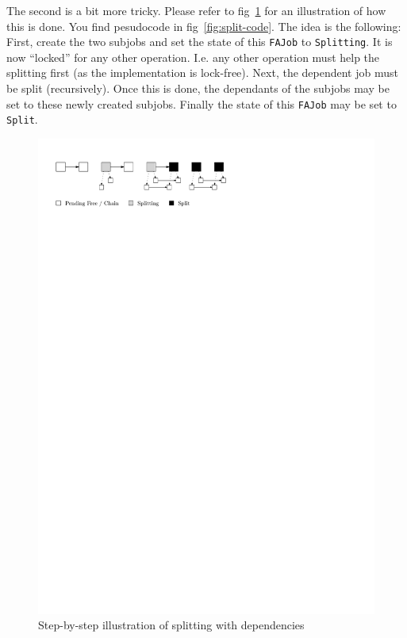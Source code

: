 \documentclass[runningheads,a4paper,fleqn]{llncs}
\begin{document}
The second is a bit more tricky. Please refer to fig~\ref{fig:split-ill}
for an illustration of how this is done. You find pesudocode in
fig~\ref{fig:split-code}. The idea is the following: First, create the
two subjobs and set the state of this \texttt{FAJob} to
\texttt{Splitting}. It is now ``locked'' for any other operation. I.e. any
other operation must help the splitting first (as the implementation
is lock-free). Next, the dependent job must be split
(recursively). Once this is done, the dependants of the subjobs may be
set to these newly created subjobs. Finally the state of this
\texttt{FAJob} may be set to \texttt{Split}.

\begin{figure}
  \centering
  \includegraphics{split}
  \caption{Step-by-step illustration of splitting with dependencies}
  \label{fig:split-ill}
\end{figure}
\end{document}
